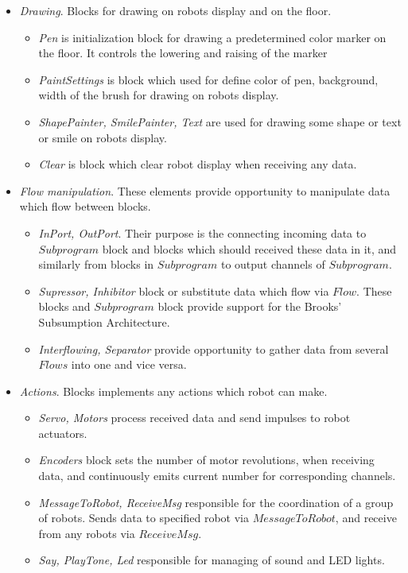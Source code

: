 \documentclass[conference,compsoc]{IEEEtran}
\begin{document}
\begin{itemize}
\begin{itemize}
\end{itemize} 
\item \textit{Drawing}. Blocks for drawing on robots display and on the floor.
\begin{itemize}
\item \textit{Pen} is initialization block for drawing a predetermined color marker on the floor.  It controls the lowering and raising of the marker
\item \textit{PaintSettings} is block which used for define color of pen, background, width of the brush for drawing on robots display.
\item \textit{ShapePainter, SmilePainter, Text} are used for drawing some shape or text or smile on robots display. 
\item \textit{Clear} is block which clear robot display when receiving any data.
\end{itemize} 
\item \textit{Flow manipulation}. These elements provide opportunity to manipulate data which flow between blocks.
\begin{itemize}
\item \textit{InPort, OutPort}. Their purpose is the connecting incoming data to $Subprogram$ block and blocks which should received these data in it, and similarly from blocks in $Subprogram$ to output channels of $Subprogram$. 
\item \textit{Supressor, Inhibitor} block or substitute data which flow via $Flow$. These blocks and $Subprogram$ block provide support for the Brooks' Subsumption Architecture. 
\item \textit{Interflowing, Separator} provide opportunity to gather data from several $Flows$ into one and vice versa.
\end{itemize} 
\item \textit{Actions}. Blocks implements any actions which robot can make.
\begin{itemize}
\item \textit{Servo, Motors} process received data and send impulses to robot actuators.
\item \textit{Encoders} block sets the number of motor revolutions, when receiving data, and continuously emits current number for corresponding channels.
\item \textit{MessageToRobot, ReceiveMsg} responsible for the coordination of a group of robots. Sends data to specified robot via $MessageToRobot$, and receive from any robots via $ReceiveMsg$.
\item \textit{Say, PlayTone, Led} responsible for managing of sound and LED lights.

\end{itemize}
\end{itemize}
\end{document}
